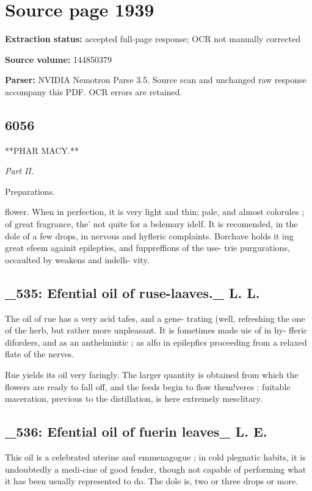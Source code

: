 \clearpage
\section{Source page 1939}
\textbf{Extraction status:} accepted full-page response; OCR not manually corrected\par
\textbf{Source volume:} 144850379\par
\textbf{Parser:} NVIDIA Nemotron Parse 3.5. Source scan and unchanged raw response accompany this PDF. OCR errors are retained.\par\medskip
\subsection*{6056}
**PHAR MACY.**\par\medskip
{\small\itshape Part II.\par}\medskip
Preparations.\par\medskip
flower. When in perfection, it is very light and thin; pale, and almost colorules ; of great fragrance, the’ not quite for a belemary idelf. It is recomended, in the dole of a few drops, in nervous and hyfleric complaints. Borchave holds it ing great efeem againit epilepties, and fuppreffions of the use- trie purgurations, occaulted by weakens and indelh- vity.\par\medskip
\subsection*{\_535: Efential oil of ruse-laaves.\_ L. L.}
The oil of rue has a very acid tafes, and a gene- trating (well, refreshing the one of the herb, but rather more unpleasant. It is fometimes made uie of in hy- fferic diforders, and as an anthelmintic ; as alfo in epilepfics proceeding from a relaxed flate of the nerves.\par\medskip
Rue yields its oil very faringly. The larger quantity is obtained from which the flowers are ready to fall off, and the feeds begin to flow them!veres : fuitable maceration, previous to the distillation, is here extremely mesclitary.\par\medskip
\subsection*{\_536: Efential oil of fuerin leaves\_ L. E.}
This oil is a celebrated uterine and emmenagogue ; in cold plegnatic habits, it is undoubtedly a medi-cine of good fender, though not capable of performing what it has been usually represented to do. The dole is, two or three drops or more.\par\medskip
